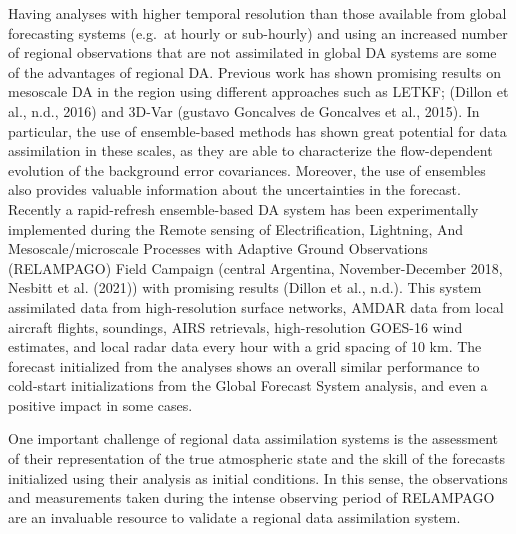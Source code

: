\documentclass[final,5p,times,twocolumn,authoryear]{elsarticle} %
\begin{document}
Having analyses with higher temporal resolution than those available from global forecasting systems (e.g.~at hourly or sub-hourly) and using an increased number of regional observations that are not assimilated in global DA systems are some of the advantages of regional DA.
Previous work has shown promising results on mesoscale DA in the region using different approaches such as LETKF; (Dillon et al., n.d., 2016) and 3D-Var (gustavo Goncalves de Goncalves et al., 2015).
In particular, the use of ensemble-based methods has shown great potential for data assimilation in these scales, as they are able to characterize the flow-dependent evolution of the background error covariances.
Moreover, the use of ensembles also provides valuable information about the uncertainties in the forecast.
Recently a rapid-refresh ensemble-based DA system has been experimentally implemented during the Remote sensing of Electrification, Lightning, And Mesoscale/microscale Processes with Adaptive Ground Observations (RELAMPAGO) Field Campaign (central Argentina, November-December 2018, Nesbitt et al. (2021)) with promising results (Dillon et al., n.d.).
This system assimilated data from high-resolution surface networks, AMDAR data from local aircraft flights, soundings, AIRS retrievals, high-resolution GOES-16 wind estimates, and local radar data every hour with a grid spacing of 10 km.
The forecast initialized from the analyses shows an overall similar performance to cold-start initializations from the Global Forecast System analysis, and even a positive impact in some cases.

One important challenge of regional data assimilation systems is the assessment of their representation of the true atmospheric state and the skill of the forecasts initialized using their analysis as initial conditions.
In this sense, the observations and measurements taken during the intense observing period of RELAMPAGO are an invaluable resource to validate a regional data assimilation system.
\end{document}
